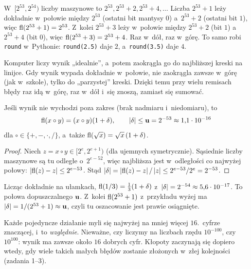 \documentclass[11pt]{article}
\begin{document}
\begin{przyklad}
W~$[2^{53},2^{54})$ liczby maszynowe to $2^{53},2^{53}+2,2^{53}+4,\ldots$
Liczba $2^{53}+1$ leży dokładnie w~połowie między $2^{53}$ (ostatni bit
mantysy $0$) a~$2^{53}+2$ (ostatni bit $1$), więc
$\operatorname{fl}(2^{53}+1)=2^{53}$. Z~kolei $2^{53}+3$ leży w~połowie między
$2^{53}+2$ (bit $1$) a~$2^{53}+4$ (bit $0$), więc
$\operatorname{fl}(2^{53}+3)=2^{53}+4$. Raz w~dół, raz w~górę. To samo robi
\texttt{round} w~Pythonie: \texttt{round(2.5)} daje $2$, a~\texttt{round(3.5)}
daje $4$.
\end{przyklad}

\begin{poludzku}
Komputer liczy wynik „idealnie”, a~potem zaokrągla go do najbliższej
kreski na linijce. Gdy wynik wypada dokładnie w~połowie, nie zaokrągla
zawsze w~górę (jak w~szkole), tylko do „parzystej” kreski. Dzięki temu
przy wielu remisach błędy raz idą w~górę, raz w~dół i~się znoszą,
zamiast się sumować.
\end{poludzku}

\begin{twierdzenie}\label{tw:model}
Jeśli wynik nie wychodzi poza zakres (brak nadmiaru i~niedomiaru), to
\[
\operatorname{fl}(x\circ y)=(x\circ y)(1+\delta),\qquad \left\lvert \delta \right\rvert\le\mathbf{u}=2^{-53}
\approx1{,}1\cdot10^{-16}
\]
dla $\circ\in\{+,-,\cdot,/\}$, a~także $\operatorname{fl}(\sqrt x)=\sqrt x\,(1+\delta)$.
\end{twierdzenie}

\begin{proof}
Niech $z=x\circ y\in[2^e,2^{e+1})$ (dla ujemnych symetrycznie). Sąsiednie
liczby maszynowe są tu odległe o~$2^{e-52}$, więc najbliższa jest w~odległości
co najwyżej połowy: $\left\lvert \operatorname{fl}(z)-z \right\rvert\le2^{e-53}$. Stąd
$\left\lvert \delta \right\rvert=\left\lvert \operatorname{fl}(z)-z \right\rvert/\left\lvert z \right\rvert\le 2^{e-53}/2^{e}=2^{-53}$.
\end{proof}

\begin{przyklad}
Licząc dokładnie na ułamkach, $\operatorname{fl}(1/3)=\tfrac13(1+\delta)$ z~$\left\lvert \delta \right\rvert=
2^{-54}\approx5{,}6\cdot10^{-17}$. To połowa dopuszczalnego $\mathbf{u}$. Z~kolei
$\operatorname{fl}(2^{53}+1)$ z~przykładu wyżej ma
$\left\lvert \delta \right\rvert=1/(2^{53}+1)\approx\mathbf{u}$, czyli tu oszacowanie jest prawie
osiągnięte.
\end{przyklad}

\begin{poludzku}
Każde pojedyncze działanie myli się najwyżej na mniej więcej
$16$.\ cyfrze znaczącej, i~to \emph{względnie}. Nieważne, czy liczymy
na liczbach rzędu $10^{-100}$, czy $10^{100}$: wynik ma zawsze około
$16$ dobrych cyfr. Kłopoty zaczynają się dopiero wtedy, gdy wiele
takich małych błędów zostanie złożonych w~złej kolejności (zadania 1--3).
\end{poludzku}
\end{document}
